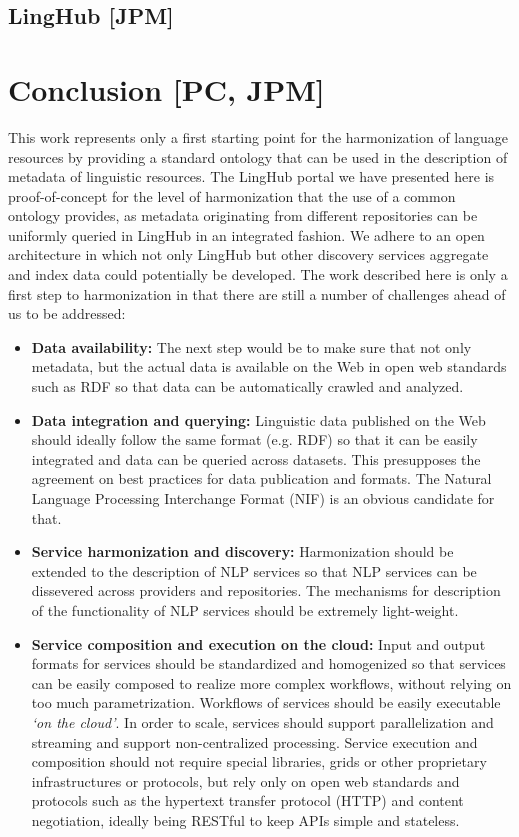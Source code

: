 \documentclass{llncs}
\begin{document}
{\subsection{LingHub [JPM]}
\section{Conclusion [PC, JPM]}
\label{sec:conclusion}
This work represents only a first starting point for the harmonization of language resources by providing a standard ontology that can be used in the description of metadata of linguistic resources. The LingHub portal we have presented here is proof-of-concept for the level of harmonization that the use of a common ontology provides, as metadata originating from different repositories can be uniformly queried in LingHub in an integrated fashion. We adhere to an open architecture in which not only LingHub but other discovery services aggregate and index data could potentially be developed.
The work described here is only a first step to harmonization in that there are still a number of challenges ahead of us to be addressed:
\begin{itemize}
\item \textbf{Data availability:} The next step would be to make sure that not only metadata, but the actual data is available on the Web in open web standards such as RDF so that data can be automatically crawled and analyzed.
\item \textbf{Data integration and querying:} Linguistic data published on the
Web should ideally follow the same format (e.g. RDF) so that it can be
easily integrated and data can be queried across datasets. This presupposes
the agreement on best practices for data publication and formats. The
Natural Language Processing Interchange Format (NIF)\cite{hellmann2013integrating} is an obvious candidate for that.
\item \textbf{Service harmonization and discovery:} Harmonization should be extended to the description of NLP services so that NLP services can be dissevered across providers and repositories. The mechanisms for description of the functionality of NLP services should be extremely light-weight.
\item \textbf{Service composition and execution on the cloud:} Input and output formats for services should be standardized and homogenized so that services can be easily composed to realize more complex workflows, without relying on too much parametrization. Workflows of services should be easily executable \emph{`on the cloud'}. In order to scale, services should support parallelization and streaming and support non-centralized processing. Service execution and composition should not require special libraries, grids or other proprietary infrastructures or protocols, but rely only on open web standards and protocols such as the hypertext transfer protocol (HTTP) and content negotiation, ideally being RESTful to keep APIs simple and stateless.
\end{itemize}
}
\end{document}
